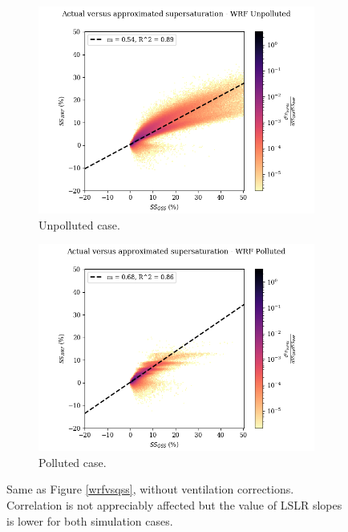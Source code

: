 \documentclass{article}
\begin{document}
\begin{figure}[ht]
	\centering
	\begin{subfigure}{0.7\textwidth}
		\includegraphics[width=\textwidth]{wrf/novent_heatmap_ss_qss_vs_ss_wrf_Unpolluted_figure.png}
		\caption{Unpolluted case.}
		\label{noventwrfvsqssunpoll}
	\end{subfigure}
	\begin{subfigure}{0.7\textwidth}
		\includegraphics[width=\textwidth]{wrf/novent_heatmap_ss_qss_vs_ss_wrf_Polluted_figure.png}
		\caption{Polluted case.}
		\label{noventwrfvsqsspoll}
	\end{subfigure}
	\caption{Same as Figure \ref{wrfvsqss}, without ventilation corrections. Correlation is not appreciably affected but the value of LSLR slopes is lower for both simulation cases.}
	\label{noventwrfvsqss}
\end{figure}
\end{document}
